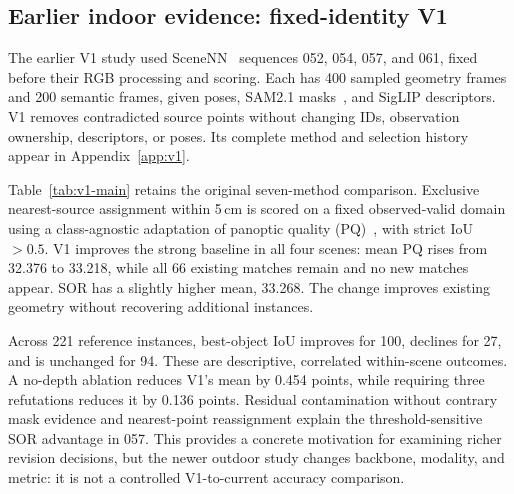 \subsection{Earlier indoor evidence: fixed-identity V1}
The earlier V1 study used SceneNN~\cite{scenenn} sequences 052, 054, 057, and 061, fixed before their RGB processing and scoring. Each has 400 sampled geometry frames and 200 semantic frames, given poses, SAM2.1 masks~\cite{sam2}, and SigLIP descriptors. V1 removes contradicted source points without changing IDs, observation ownership, descriptors, or poses. Its complete method and selection history appear in Appendix~\ref{app:v1}.

Table~\ref{tab:v1-main} retains the original seven-method comparison. Exclusive nearest-source assignment within 5\,cm is scored on a fixed observed-valid domain using a class-agnostic adaptation of panoptic quality (PQ)~\cite{pq}, with strict IoU $>0.5$. V1 improves the strong baseline in all four scenes: mean PQ rises from 32.376 to 33.218, while all 66 existing matches remain and no new matches appear. SOR has a slightly higher mean, 33.268. The change improves existing geometry without recovering additional instances.

Across 221 reference instances, best-object IoU improves for 100, declines for 27, and is unchanged for 94. These are descriptive, correlated within-scene outcomes. A no-depth ablation reduces V1's mean by 0.454 points, while requiring three refutations reduces it by 0.136 points. Residual contamination without contrary mask evidence and nearest-point reassignment explain the threshold-sensitive SOR advantage in 057. This provides a concrete motivation for examining richer revision decisions, but the newer outdoor study changes backbone, modality, and metric: it is not a controlled V1-to-current accuracy comparison.
